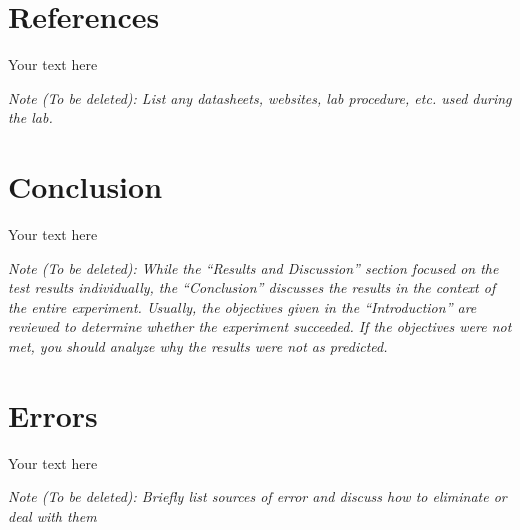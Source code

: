 \documentclass[10pt]{article}
\begin{document}
\section{References}

Your text here

\medskip

\textit{Note (To be deleted): List any datasheets, websites, lab procedure, etc. used during the lab.}

\section{Conclusion}

Your text here

\medskip

\textit{Note (To be deleted): While the ``Results and Discussion'' section focused on the test results individually, the ``Conclusion'' discusses the results in the context of the entire experiment. Usually, the objectives given in the ``Introduction'' are reviewed to determine whether the experiment succeeded. If the objectives were not met, you should analyze why the results were not as predicted.}

\section{Errors}

Your text here

\medskip

\textit{Note (To be deleted): Briefly list sources of error and discuss how to eliminate or deal with them}
\end{document}
